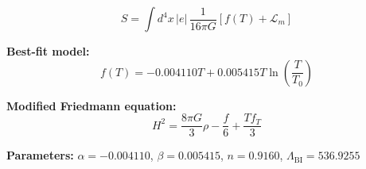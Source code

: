 
\begin{equation}
  S = \int d^4x \, |e| \, \frac{1}{16\pi G} \left[ f(T) + \mathcal{L}_m \right]
\end{equation}

\textbf{Best-fit model:}
\begin{equation}
  f(T) = -0.004110 T + 0.005415 T \ln\!\left(\frac{T}{T_0}\right)
\end{equation}

\textbf{Modified Friedmann equation:}
\begin{equation}
  H^2 = \frac{8\pi G}{3} \rho - \frac{f}{6} + \frac{T f_T}{3}
\end{equation}

\textbf{Parameters:}
$\alpha = -0.004110$, \quad
$\beta = 0.005415$, \quad
$n = 0.9160$, \quad
$\Lambda_{\text{BI}} = 536.9255$
